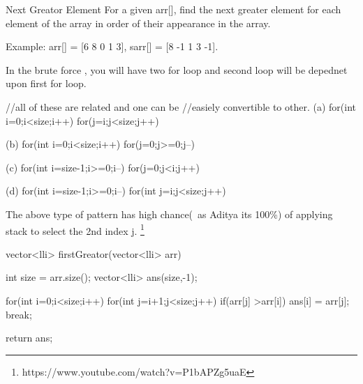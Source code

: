 \begin{problem}{Next Greator Element}
    For a given arr[], find the next greater element for each element of the array in order of their appearance in the array.

    Example: arr[] = [6 8 0 1 3], sarr[] = [8 -1 1 3 -1].
\end{problem}

\begin{solution}

    In the brute force , you will have two for loop and second loop will be depednet upon first for loop.

    \begin{code}
        //all of these are related and one can be 
        //easiely convertible to other.
        (a) for(int i=0;i<size;i++) 
            for(j=i;j<size;j++)

        (b) for(int i=0;i<size;i++)
            for(j=0;j>=0;j--)
        
        (c) for(int i=size-1;i>=0;i--)
            for(j=0;j<i;j++)
        
        (d) for(int i=size-1;i>=0;i--)
            for(int j=i;j<size;j++)
    \end{code}

    The above type of pattern has high chance(~as Aditya its 100\%) of applying stack to select the 2nd index j.
    \footnote{https://www.youtube.com/watch?v=P1bAPZg5uaE}

    \begin{code2}
        vector<lli> firstGreator(vector<lli> arr)
        {
            int size = arr.size();
            vector<lli> ans(size,-1);
            
           for(int i=0;i<size;i++)
           {    
               for(int j=i+1;j<size;j++)
               {
                   if(arr[j] >arr[i])
                   {
                       ans[i] = arr[j];
                       break;
                   }
               }
           }
           
           return ans;
        }
    \end{code2}

\end{solution}

